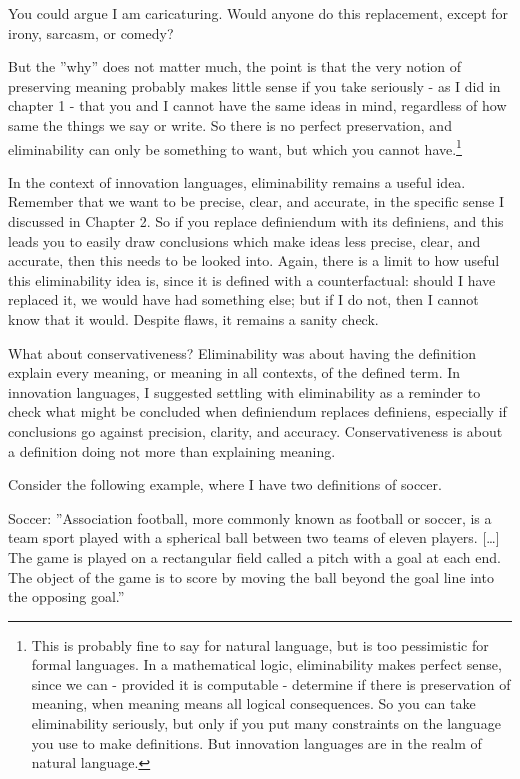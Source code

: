 You could argue I am caricaturing. Would anyone do this replacement, except for irony, sarcasm, or comedy? 

But the ''why'' does not matter much, the point is that the very notion of preserving meaning probably makes little sense if you take seriously - as I did in chapter 1 - that you and I cannot have the same ideas in mind, regardless of how same the things we say or write. So there is no perfect preservation, and eliminability can only be something to want, but which you cannot have.\footnote{This is probably fine to say for natural language, but is too pessimistic for formal languages. In a mathematical logic, eliminability makes perfect sense, since we can - provided it is computable - determine if there is preservation of meaning, when meaning means all logical consequences. So you can take eliminability seriously, but only if you put many constraints on the language you use to make definitions. But innovation languages are in the realm of natural language.}

In the context of innovation languages, eliminability remains a useful idea. Remember that we want to be precise, clear, and accurate, in the specific sense I discussed in Chapter 2. So if you replace definiendum with its definiens, and this leads you to easily draw conclusions which make ideas less precise, clear, and accurate, then this needs to be looked into. Again, there is a limit to how useful this eliminability idea is, since it is defined with a counterfactual: should I have replaced it, we would have had something else; but if I do not, then I cannot know that it would. Despite flaws, it remains a sanity check. 

What about conservativeness? Eliminability was about having the definition explain every meaning, or meaning in all contexts, of the defined term. In innovation languages, I suggested settling with eliminability as a reminder to check what might be concluded when definiendum replaces definiens, especially if conclusions go against precision, clarity, and accuracy. Conservativeness is about a definition doing not more than explaining meaning. 

Consider the following example, where I have two definitions of soccer.

\begin{svgraybox}
Soccer: ''Association football, more commonly known as football or soccer, is a team sport played with a spherical ball between two teams of eleven players. […] The game is played on a rectangular field called a pitch with a goal at each end. The object of the game is to score by moving the ball beyond the goal line into the opposing goal.'' \cite{wikipedia-association-football}
\end{svgraybox}

